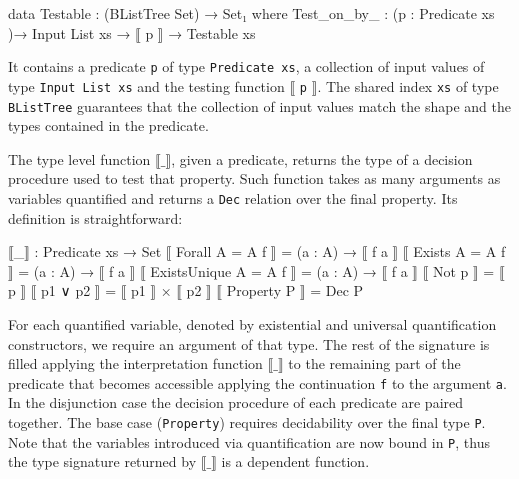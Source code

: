 \documentclass[10pt,a4paper]{article}
\begin{document}
\begin{code}
data Testable : (BListTree Set) → Set₁ where
  Test_on_by_ : (p : Predicate xs )→ Input List xs →  ⟦ p ⟧ → Testable xs
\end{code}

It contains a predicate \texttt{p} of type \texttt{Predicate xs}, a collection of input values of type \texttt{Input List xs} and the testing function $\llbracket$ \texttt{p} $ \rrbracket$. The shared index \texttt{xs} of type \texttt{BListTree} guarantees that the collection of input values match the shape and the types contained in the predicate.

The type level function $\llbracket\_\rrbracket$, given a predicate, returns the type of a decision procedure used to test that property.
Such function takes as many arguments as variables quantified and returns a \texttt{Dec} relation over the final property.
Its definition is straightforward:
\begin{code}
⟦_⟧ : Predicate xs → Set
⟦ Forall {A = A} f ⟧ = (a : A) → ⟦ f a ⟧
⟦ Exists {A = A} f ⟧ = (a : A) → ⟦ f a ⟧
⟦ ExistsUnique {A = A} f ⟧ = (a : A) → ⟦ f a ⟧
⟦ Not p ⟧ = ⟦ p ⟧
⟦ p1 ∨ p2 ⟧ = ⟦ p1 ⟧ × ⟦ p2 ⟧
⟦ Property P ⟧ = Dec P
\end{code}
For each quantified variable, denoted by existential and universal quantification  constructors, we require an argument of that type. 
The rest of the signature is  filled applying the  interpretation function 
$\llbracket\_\rrbracket$  to the remaining 
part of the predicate that becomes accessible applying the continuation 
\texttt{f} to the argument \texttt{a}.
In the disjunction  case the decision procedure of each predicate are paired together. The base case (\texttt{Property}) requires decidability over the final type \texttt{P}. Note that the variables introduced via quantification are now bound in \texttt{P}, thus the type signature returned by $\llbracket\_\rrbracket$ is a dependent function. 
\end{document}
